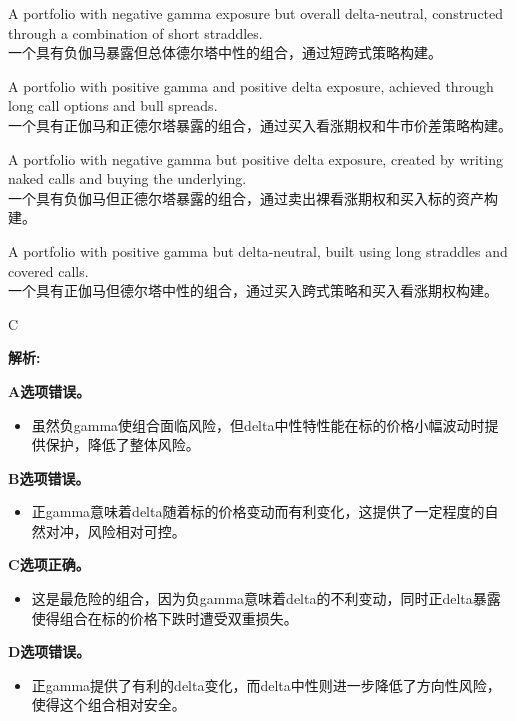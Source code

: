 \documentclass{article}
\newenvironment{explanation}
{\textbf{解析:}\par}
{\par}
\begin{document}
    \begin{choices}
    \item A portfolio with negative gamma exposure but overall delta-neutral, constructed through a combination of short straddles.\\
    一个具有负伽马暴露但总体德尔塔中性的组合，通过短跨式策略构建。
    \item A portfolio with positive gamma and positive delta exposure, achieved through long call options and bull spreads.\\
    一个具有正伽马和正德尔塔暴露的组合，通过买入看涨期权和牛市价差策略构建。
    \item A portfolio with negative gamma but positive delta exposure, created by writing naked calls and buying the underlying.\\
    一个具有负伽马但正德尔塔暴露的组合，通过卖出裸看涨期权和买入标的资产构建。
    \item A portfolio with positive gamma but delta-neutral, built using long straddles and covered calls.\\
    一个具有正伽马但德尔塔中性的组合，通过买入跨式策略和买入看涨期权构建。
    \end{choices}
    
    \begin{correctanswer}
    C
    \end{correctanswer}
    
    \begin{explanation}
    \textbf{A选项错误。}
    \begin{itemize}
        \item 虽然负gamma使组合面临风险，但delta中性特性能在标的价格小幅波动时提供保护，降低了整体风险。
    \end{itemize}
    
    \textbf{B选项错误。}
    \begin{itemize}
        \item 正gamma意味着delta随着标的价格变动而有利变化，这提供了一定程度的自然对冲，风险相对可控。
    \end{itemize}
    
    \textbf{C选项正确。}
    \begin{itemize}
        \item 这是最危险的组合，因为负gamma意味着delta的不利变动，同时正delta暴露使得组合在标的价格下跌时遭受双重损失。
    \end{itemize}
    
    \textbf{D选项错误。}
    \begin{itemize}
        \item 正gamma提供了有利的delta变化，而delta中性则进一步降低了方向性风险，使得这个组合相对安全。
    \end{itemize}
    \end{explanation}
    
\end{document}
